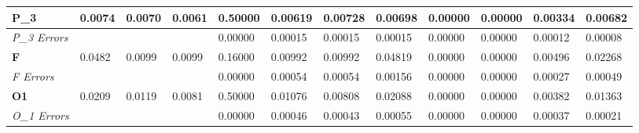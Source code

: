 \documentclass[]{scrartcl}
\begin{document}
\begin{table}[]
\begin{tabular}{|l|l|l|l|l|l|l|l|l|l|l|l|}
		\textbf{P\_3}                         & 0.0074                          & 0.0070                          & 0.0061                          & 0.50000                           & 0.00619                           & 0.00728                           & 0.00698                           & 0.00000                           & 0.00000                           & 0.00334                           & 0.00682                           \\ \hline
		\textit{P\_3 Errors}                           &                                 &                                 &                                 & 0.00000                           & 0.00015                           & 0.00015                           & 0.00015                           & 0.00000                           & 0.00000                           & 0.00012                           & 0.00008                           \\ \hline
		\textbf{F}                          & 0.0482                          & 0.0099                          & 0.0099                          & 0.16000                           & 0.00992                           & 0.00992                           & 0.04819                           & 0.00000                           & 0.00000                           & 0.00496                           & 0.02268                           \\ \hline
		\textit{F Errors}                           &                                 &                                 &                                 & 0.00000                           & 0.00054                           & 0.00054                           & 0.00156                           & 0.00000                           & 0.00000                           & 0.00027                           & 0.00049                           \\ \hline
		\textbf{O1}                         & 0.0209                          & 0.0119                          & 0.0081                          & 0.50000                           & 0.01076                           & 0.00808                           & 0.02088                           & 0.00000                           & 0.00000                           & 0.00382                           & 0.01363                           \\ \hline
		\textit{O\_1 Errors}
		&                                 &                                 &                                 & 0.00000                           & 0.00046                           & 0.00043                           & 0.00055                           & 0.00000                           & 0.00000                           & 0.00037                           & 0.00021                           \\ \hline

\end{tabular}
\end{table}
\end{document}
